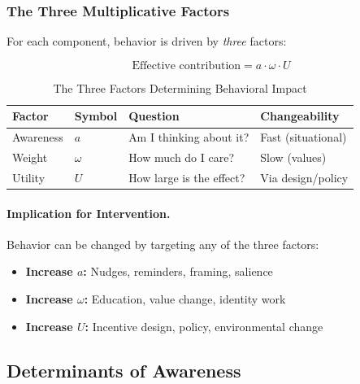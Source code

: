 \subsubsection{The Three Multiplicative Factors}

For each component, behavior is driven by \emph{three} factors:

\begin{equation}
\text{Effective contribution} = a \cdot \omega \cdot U
\end{equation}

\begin{table}[htbp]
\centering
\caption{The Three Factors Determining Behavioral Impact}
\label{tab:three-factors}
\renewcommand{\arraystretch}{1.4}
\begin{tabular}{@{}llll@{}}
\toprule
\textbf{Factor} & \textbf{Symbol} & \textbf{Question} & \textbf{Changeability} \\
\midrule
Awareness & $a$ & Am I thinking about it? & Fast (situational) \\
Weight & $\omega$ & How much do I care? & Slow (values) \\
Utility & $U$ & How large is the effect? & Via design/policy \\
\bottomrule
\end{tabular}
\end{table}

\paragraph{Implication for Intervention.}
Behavior can be changed by targeting any of the three factors:

\begin{itemize}
\item \textbf{Increase $a$:} Nudges, reminders, framing, salience
\item \textbf{Increase $\omega$:} Education, value change, identity work
\item \textbf{Increase $U$:} Incentive design, policy, environmental change
\end{itemize}

\subsection{Determinants of Awareness}
\label{subsec:awareness-determinants}

